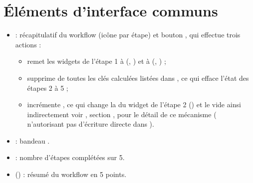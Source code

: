\documentclass[letterpaper,10pt,english]{sphinxmanual}
\begin{document}
\section{Éléments d’interface communs}
\label{\detokenize{1_Integration:elements-d-interface-communs}}\begin{itemize}
\item {} 
\sphinxAtStartPar
{} : récapitulatif du workflow (icône par étape) et bouton
, qui effectue trois actions :
\begin{itemize}
\item {} 
\sphinxAtStartPar
remet les widgets de l’étape 1 à  (, ) et à 
(, ) ;

\item {} 
\sphinxAtStartPar
supprime de  toutes les clés calculées listées dans
, ce qui efface l’état des étapes 2 à 5 ;

\item {} 
\sphinxAtStartPar
incrémente , ce qui change la  du widget
 de l’étape 2
() et
le vide ainsi indirectement \sphinxhyphen{} voir {\hyperref[\detokenize{Home::doc}]{}}, section
, pour le détail de ce mécanisme
( n’autorisant pas d’écriture directe dans
).

\end{itemize}

\item {} 
\sphinxAtStartPar
{} : bandeau .

\item {} 
\sphinxAtStartPar
{} : nombre d’étapes complétées sur 5.

\item {} 
\sphinxAtStartPar
{} () : résumé du workflow en 5 points.

\end{itemize}
\end{document}
